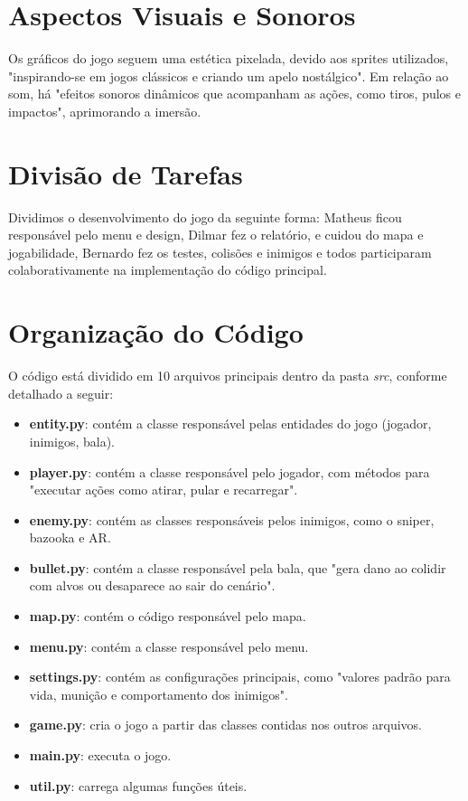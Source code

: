\documentclass[a4paper]{article}
\begin{document}
\section{Aspectos Visuais e Sonoros}

Os gráficos do jogo seguem uma estética pixelada, devido aos sprites utilizados, "inspirando-se em jogos clássicos e criando um apelo nostálgico". Em relação ao som, há "efeitos sonoros dinâmicos que acompanham as ações, como tiros, pulos e impactos", aprimorando a imersão.

\section{Divisão de Tarefas}

Dividimos o desenvolvimento do jogo da seguinte forma: Matheus ficou responsável pelo menu e design, Dilmar fez o relatório, e cuidou do mapa e jogabilidade, Bernardo fez os testes, colisões e inimigos e todos participaram colaborativamente na implementação do código principal.

\section{Organização do Código}

O código está dividido em 10 arquivos principais dentro da pasta \textit{src}, conforme detalhado a seguir:

\begin{itemize}
    \item \textbf{entity.py}: contém a classe responsável pelas entidades do jogo (jogador, inimigos, bala).
    \item \textbf{player.py}: contém a classe responsável pelo jogador, com métodos para "executar ações como atirar, pular e recarregar".
    \item \textbf{enemy.py}: contém as classes responsáveis pelos inimigos, como o sniper, bazooka e AR.
    \item \textbf{bullet.py}: contém a classe responsável pela bala, que "gera dano ao colidir com alvos ou desaparece ao sair do cenário".
    \item \textbf{map.py}: contém o código responsável pelo mapa.
    \item \textbf{menu.py}: contém a classe responsável pelo menu.
    \item \textbf{settings.py}: contém as configurações principais, como "valores padrão para vida, munição e comportamento dos inimigos".
    \item \textbf{game.py}: cria o jogo a partir das classes contidas nos outros arquivos.
    \item \textbf{main.py}: executa o jogo.
    \item \textbf{util.py}: carrega algumas funções úteis.
\end{itemize}
\end{document}
